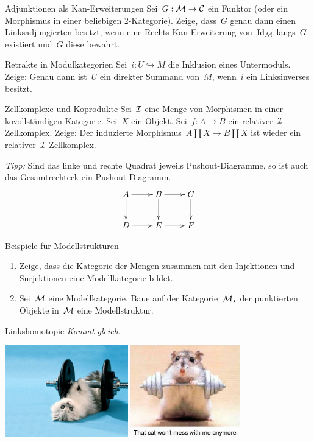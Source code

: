 \documentclass{uebblatt}
\begin{document}

\begin{aufgabe}{Adjunktionen als Kan-Erweiterungen}
Sei~$G : \mathcal{M} \to \mathcal{C}$ ein Funktor (oder ein Morphismus in einer beliebigen
2-Kategorie). Zeige, dass~$G$ genau dann einen Linksadjungierten besitzt, wenn
eine Rechts-Kan-Erweiterung von~$\mathrm{Id}_{\mathcal{M}}$ längs~$G$ existiert und~$G$ diese
bewahrt.
\end{aufgabe}

\begin{aufgabe}{Retrakte in Modulkategorien}
Sei~$i : U \hookrightarrow M$ die Inklusion eines Untermoduls. Zeige: Genau
dann ist~$U$ ein direkter Summand von~$M$, wenn~$i$ ein Linksinverses besitzt.
\end{aufgabe}

\begin{aufgabe}{Zellkomplexe und Koprodukte}
Sei~$\mathcal{I}$ eine Menge von Morphismen in einer kovollständigen Kategorie.
Sei~$X$ ein Objekt. Sei~$f : A \to B$ ein relativer~$\mathcal{I}$-Zellkomplex. Zeige: Der
induzierte Morphismus~$A \amalg X \to B \amalg X$ ist wieder ein
relativer~$\mathcal{I}$-Zellkomplex.

\emph{Tipp:} Sind das linke und rechte Quadrat jeweils Pushout-Diagramme, so
ist auch das Gesamtrechteck ein Pushout-Diagramm.
\[ \xymatrix{
  A \ar[r]\ar[d] & B \ar[r]\ar[d] & C \ar[d] \\
  D \ar[r] & E \ar[r] & F
} \]
\end{aufgabe}
\vspace{-1em}

\begin{aufgabe}{Beispiele für Modellstrukturen}
\begin{enumerate}
\item Zeige, dass die Kategorie der Mengen zusammen mit den Injektionen und
Surjektionen eine Modellkategorie bildet.
\item Sei~$\mathcal{M}$ eine Modellkategorie. Baue auf der Kategorie~$\mathcal{M}_\star$ der
punktierten Objekte in~$\mathcal{M}$ eine Modellstruktur.
\end{enumerate}
\end{aufgabe}

\begin{aufgabe}{Linkshomotopie}
\emph{Kommt gleich}.
\end{aufgabe}

\vfill
\centering
\href{http://fashions-cloud.com/pages/c/cat-lifting-weights/}{\includegraphics[height=4cm]{images/lifting-property-1}}
\qquad
\href{http://www.woophotos.com/weight-lifter/}{\includegraphics[height=4cm]{images/lifting-property-2}}
\par
\end{document}
